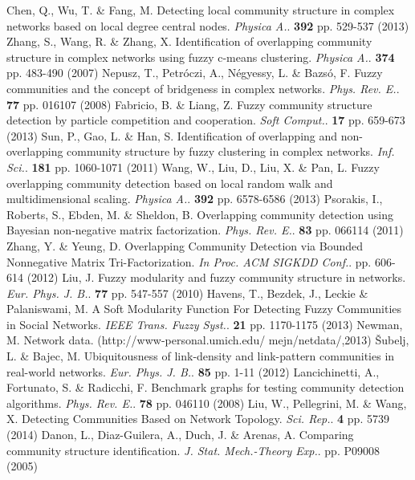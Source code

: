 \documentclass{article}
\begin{document}
\begin{thebibliography}{1}
	Chen, Q., Wu, T. \& Fang, M. Detecting local community structure in complex networks based on local degree central nodes. {\em Physica A.}. \textbf{392} pp. 529-537 (2013)
	Zhang, S., Wang, R. \& Zhang, X. Identification of overlapping community structure in complex networks using fuzzy c-means clustering. {\em Physica A.}. \textbf{374} pp. 483-490 (2007)
	Nepusz, T., Petróczi, A., Négyessy, L. \& Bazsó, F. Fuzzy communities and the concept of bridgeness in complex networks. {\em Phys. Rev. E.}. \textbf{77} pp. 016107 (2008)
	Fabricio, B. \& Liang, Z. Fuzzy community structure detection by particle competition and cooperation. {\em Soft Comput.}. \textbf{17} pp. 659-673 (2013)
	Sun, P., Gao, L. \& Han, S. Identification of overlapping and non-overlapping community structure by fuzzy clustering in complex networks. {\em Inf. Sci.}. \textbf{181} pp. 1060-1071 (2011)
	Wang, W., Liu, D., Liu, X. \& Pan, L. Fuzzy overlapping community detection based on local random walk and multidimensional scaling. {\em Physica A.}. \textbf{392} pp. 6578-6586 (2013)
	Psorakis, I., Roberts, S., Ebden, M. \& Sheldon, B. Overlapping community detection using Bayesian non-negative matrix factorization. {\em Phys. Rev. E.}. \textbf{83} pp. 066114 (2011)
	Zhang, Y. \& Yeung, D. Overlapping Community Detection via Bounded Nonnegative Matrix Tri-Factorization. {\em In Proc. ACM SIGKDD Conf.}. pp. 606-614 (2012)
	Liu, J. Fuzzy modularity and fuzzy community structure in networks. {\em Eur. Phys. J. B.}. \textbf{77} pp. 547-557 (2010)
	Havens, T., Bezdek, J., Leckie \& Palaniswami, M. A Soft Modularity Function For Detecting Fuzzy Communities in Social Networks. {\em IEEE Trans. Fuzzy Syst.}. \textbf{21} pp. 1170-1175 (2013)
	Newman, M. Network data. (http://www-personal.umich.edu/ mejn/netdata/,2013)
	Šubelj, L. \& Bajec, M. Ubiquitousness of link-density and link-pattern communities in real-world networks. {\em Eur. Phys. J. B.}. \textbf{85} pp. 1-11 (2012)
	Lancichinetti, A., Fortunato, S. \& Radicchi, F. Benchmark graphs for testing community detection algorithms. {\em Phys. Rev. E.}. \textbf{78} pp. 046110 (2008)
	Liu, W., Pellegrini, M. \& Wang, X. Detecting Communities Based on Network Topology. {\em Sci. Rep.}. \textbf{4} pp. 5739 (2014)
	Danon, L., Diaz-Guilera, A., Duch, J. \& Arenas, A. Comparing community structure identification. {\em J. Stat. Mech.-Theory Exp.}. pp. P09008 (2005)

\end{thebibliography}
\end{document}
